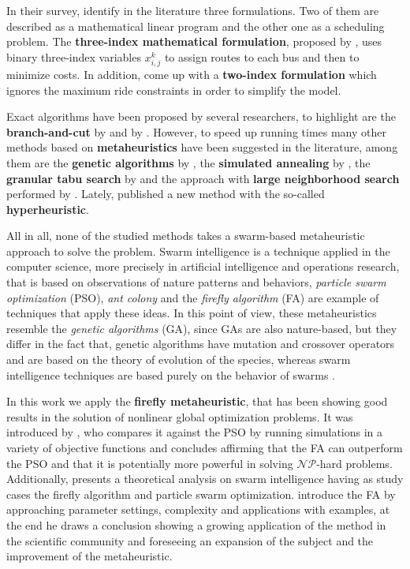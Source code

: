 \documentclass[tuberlin,cic,tc,openright,english,noabntcite,oneside]{iiufrgs}
\begin{document}
In their survey, \textcite{cordeau_dial--ride_2007} identify in the literature three formulations. Two of them are described as a mathematical linear program and the other one as a scheduling problem. The \textbf{three-index mathematical formulation}, proposed by \textcite{cordeau_branch-and-cut_2006}, uses binary three-index variables $x_{i,j}^{k}$ to assign routes to each bus and then to minimize costs. In addition, \textcite{ropke_models_2007} come up with a \textbf{two-index formulation} which ignores the maximum ride constraints in order to simplify the model.

Exact algorithms have been proposed by several researchers, to highlight are the \textbf{branch-and-cut} by \textcite{cordeau_branch-and-cut_2006} and by \textcite{ropke_models_2007}. However, to speed up running times many other methods based on \textbf{metaheuristics} have been suggested in the literature, among them are the \textbf{genetic algorithms} by \textcite{jorgensen_solving_2007}, the \textbf{simulated annealing} by \textcite{zidi_multi-objective_2012}, the \textbf{granular tabu search} by \textcite{kirchler_granular_2013} and the approach with \textbf{large neighborhood search} performed by \textcite{parragh_hybrid_2013}. Lately, \textcite{urra_hyperheuristic_2015} published a new method with the so-called \textbf{hyperheuristic}.

All in all, none of the studied methods takes a swarm-based metaheuristic approach to solve the problem. Swarm intelligence is a technique applied in the computer science, more precisely in artificial intelligence and operations research, that is based on observations of nature patterns and behaviors, \emph{particle swarm optimization} (PSO), \emph{ant colony} and the \emph{firefly algorithm} (FA) are example of techniques that apply these ideas. In this point of view, these metaheuristics resemble the \emph{genetic algorithms} (GA), since GAs are also nature-based, but they differ in the fact that, genetic algorithms have mutation and crossover operators and are based on the theory of evolution of the species, whereas swarm intelligence techniques are based purely on the behavior of swarms \parencite[p. 189-190]{yang_efficiency_2012}.

In this work we apply the \textbf{firefly metaheuristic}, that has been showing good results in the solution of nonlinear global optimization problems. It was introduced by \textcite{yang_firefly_2009}, who compares it against the PSO by running simulations in a variety of objective functions and concludes affirming that the FA can outperform the PSO and that it is potentially more powerful in solving $\mathcal{NP}$-hard problems. Additionally, \textcite{yang_efficiency_2012} presents a theoretical analysis on swarm intelligence having as study cases the firefly algorithm and particle swarm optimization. \textcite{yang_firefly_2013} introduce the FA by approaching parameter settings, complexity and applications with examples, at the end he draws a conclusion showing a growing application of the method in the scientific community and foreseeing an expansion of the subject and the improvement of the metaheuristic.
\end{document}
